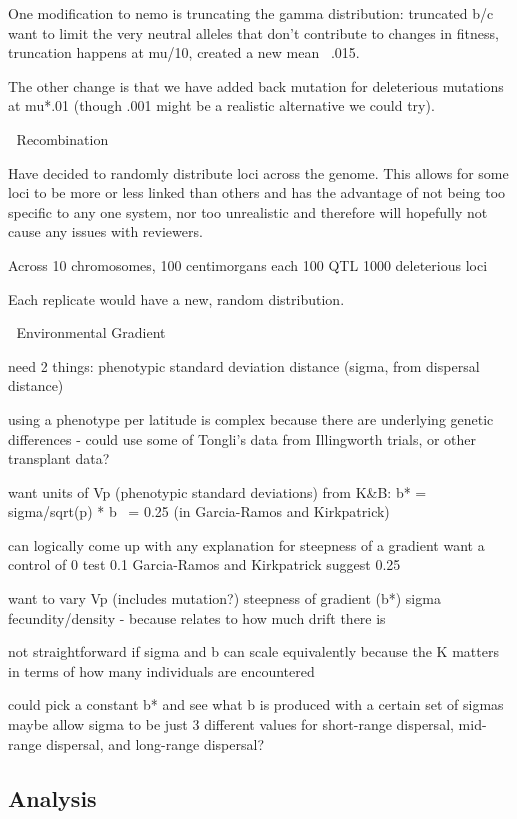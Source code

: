 One modification to nemo is truncating the gamma distribution: truncated b/c want to limit the very neutral alleles that don’t 
contribute to changes in fitness, truncation happens at mu/10, created a new mean ~.015.


The other change is that we have added back mutation for deleterious mutations at mu*.01 (though .001 might be a realistic alternative we could try).


Recombination


Have decided to randomly distribute loci across the genome. This allows for some loci to be more or less linked than 
others and has the advantage of not being too specific to any one system, nor too unrealistic and therefore will 
hopefully not cause any issues with reviewers.

Across 10 chromosomes, 100 centimorgans each
	100 QTL
	1000 deleterious loci

Each replicate would have a new, random distribution.


Environmental Gradient

need 2 things:
phenotypic standard deviation
distance (sigma, from dispersal distance)

using a phenotype per latitude is complex because there are underlying genetic differences - could use some of 
Tongli’s data from Illingworth trials, or other transplant data?

want units of Vp (phenotypic standard deviations)
from K\&B: b* = sigma/sqrt(p) * b ~= 0.25 (in Garcia-Ramos and Kirkpatrick)

can logically come up with any explanation for steepness of a gradient
	want a control of 0
	test 0.1
	Garcia-Ramos and Kirkpatrick suggest 0.25
	
want to vary Vp (includes mutation?)
steepness of gradient (b*)
sigma
fecundity/density - because relates to how much drift there is

not straightforward if sigma and b can scale equivalently because the K matters in terms of how many individuals are encountered

could pick a constant b* and see what b is produced with a certain set of sigmas
maybe allow sigma to be just 3 different values for short-range dispersal, mid-range dispersal, and long-range dispersal?


\subsection{Analysis}


